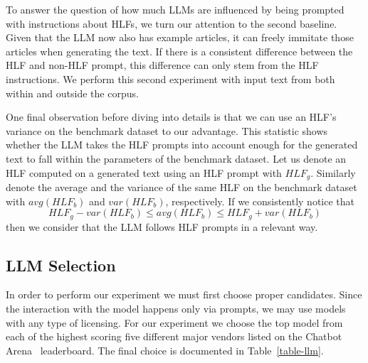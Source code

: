 \documentclass[runningheads,a4paper,11pt]{article}
\begin{document}
To answer the question of how much LLMs are influenced by being prompted with
instructions about HLFs, we turn our attention to the second baseline.
Given that the LLM now also has example articles, it can freely immitate those
articles when generating the text.
If there is a consistent difference between the HLF and non-HLF prompt, this
difference can only stem from the HLF instructions.
We perform this second experiment with input text from both within and outside
the corpus.

One final observation before diving into details is that we can use an HLF's
variance on the benchmark dataset to our advantage.
This statistic shows whether the LLM takes the HLF prompts into account enough
for the generated text to fall within the parameters of the benchmark dataset.
Let us denote an HLF computed on a generated text using an HLF prompt with
$HLF_g$.
Similarly denote the average and the variance of the same HLF on the benchmark
dataset with $avg(HLF_b)$ and $var(HLF_b)$, respectively.
If we consistently notice that
    \[HLF_g - var(HLF_b) \leq avg(HLF_b) \leq HLF_g + var(HLF_b)\]
then we consider that the LLM follows HLF prompts in a relevant way.

\subsection{LLM Selection}\label{llm-selection}

In order to perform our experiment we must first choose proper candidates.
Since the interaction with the model happens only via prompts, we may use models
with any type of licensing.
For our experiment we choose the top model from each of the highest scoring five
different major vendors listed on the Chatbot Arena~\cite{chiang2024chatbot}
leaderboard.
The final choice is documented in Table~\ref{table-llm}.
\end{document}
